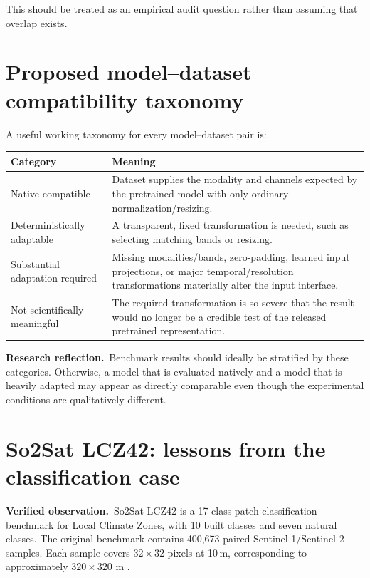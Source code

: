 \documentclass[11pt,a4paper]{article}
\newcommand{\verified}{\textcolor{verifiedgreen}{\textbf{Verified observation.}}}
\newcommand{\reflection}{\textcolor{reflectionorange}{\textbf{Research reflection.}}}
\begin{document}
This should be treated as an empirical audit question rather than assuming that overlap exists.

\section{Proposed model--dataset compatibility taxonomy}

A useful working taxonomy for every model--dataset pair is:

\begin{center}
\begin{tabular}{p{3.7cm}p{9.0cm}}
\toprule
\textbf{Category} & \textbf{Meaning} \\
\midrule
Native-compatible &
Dataset supplies the modality and channels expected by the pretrained model with only ordinary normalization/resizing. \\

Deterministically adaptable &
A transparent, fixed transformation is needed, such as selecting matching bands or resizing. \\

Substantial adaptation required &
Missing modalities/bands, zero-padding, learned input projections, or major temporal/resolution transformations materially alter the input interface. \\

Not scientifically meaningful &
The required transformation is so severe that the result would no longer be a credible test of the released pretrained representation. \\
\bottomrule
\end{tabular}
\end{center}

\reflection\ Benchmark results should ideally be stratified by these categories. Otherwise,
a model that is evaluated natively and a model that is heavily adapted may appear as directly
comparable even though the experimental conditions are qualitatively different.

\section{So2Sat LCZ42: lessons from the classification case}

\verified\ So2Sat LCZ42 is a 17-class patch-classification benchmark for Local Climate Zones,
with 10 built classes and seven natural classes. The original benchmark contains 400,673
paired Sentinel-1/Sentinel-2 samples. Each sample covers \(32\times32\) pixels at 10\,m,
corresponding to approximately \(320\times320\) m \cite{so2sat}.
\end{document}
